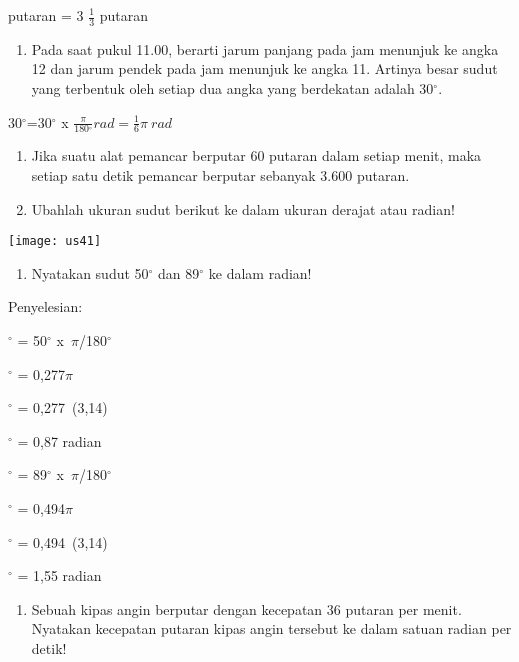 \documentclass[11pt,fleqn]{book} %
\begin{document}
\noindent {} putaran = 3 $\frac{1}{3} $ putaran

\begin{enumerate}
\item  Pada saat pukul 11.00, berarti jarum panjang pada jam menunjuk ke angka 12 dan jarum pendek pada jam menunjuk ke angka 11. Artinya besar sudut yang terbentuk oleh setiap dua angka yang berdekatan adalah 30${}^\circ $.
\end{enumerate}

\noindent 

\noindent $30{}^\circ $=$30{}^\circ $ x $\frac{\pi }{180{}^\circ }rad=\frac{1}{6}\pi \ rad$

\begin{enumerate}
\item  Jika suatu alat pemancar berputar 60 putaran dalam setiap menit, maka setiap satu detik pemancar berputar sebanyak  3.600 putaran.

\item  Ubahlah ukuran sudut berikut ke dalam ukuran derajat atau radian!
\end{enumerate}

\noindent \texttt{[image: us41]}

\begin{enumerate}
\item  Nyatakan sudut 50${}^\circ$ dan 89${}^\circ$ ke dalam radian!
\end{enumerate}

\noindent Penyelesian:

${}^\circ$ = 50$\mathrm{{}^\circ}$ x~$\pi$/180$\mathrm{{}^\circ}$

$\mathrm{{}^\circ}$ = 0,277$\pi$

${}^\circ$ = 0,277~(3,14)

${}^\circ$ = 0,87 radian

\noindent 

$\mathrm{{}^\circ}$ = 89$\mathrm{{}^\circ}$ x~$\pi$/180$\mathrm{{}^\circ}$

$\mathrm{{}^\circ}$ = 0,494$\pi$

${}^\circ$ = 0,494~(3,14)

${}^\circ$ = 1,55 radian

\noindent 

\begin{enumerate}
\item  Sebuah kipas angin berputar dengan kecepatan 36 putaran per menit. Nyatakan kecepatan putaran kipas angin tersebut ke dalam satuan radian per detik!
\end{enumerate}
\end{document}
